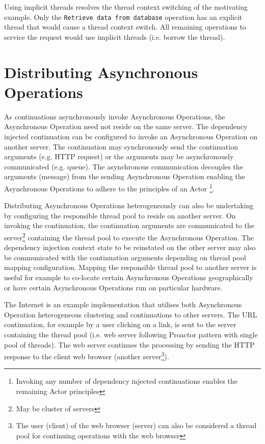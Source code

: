 \documentclass[prodmode]{style/acmlarge}
\begin{document}
Using implicit threads resolves the thread context switching of the motivating
example.  Only the \texttt{Retrieve data from database} operation has an
explicit thread that would cause a thread context switch.  All remaining
operations to service the request would use implicit threads (i.e. borrow the
thread).


\section{Distributing Asynchronous Operations}

As continuations asynchronously invoke Asynchronous Operations, the Asynchronous
Operation need not reside on the same server.  The dependency injected
continuation can be configured to invoke an Asynchronous Operation on another
server.  The continuation may synchronously send the continuation arguments
(e.g. HTTP request) or the arguments may be asynchronously communicated (e.g.
queue).  The asynchronous communication decouples the arguments (message) from
the sending Asynchronous Operation enabling the Asynchronous Operations to
adhere to the principles of an Actor \cite{actors}\footnote{Invoking any number
of dependency injected continuations enables the remaining Actor principles}.

Distributing Asynchronous Operations heterogeneously can also be undertaking by
configuring the responsible thread pool to reside on another server.  On
invoking the continuation, the continuation arguments are communicated to the
server\footnote{May be cluster of servers} containing the thread pool to execute
the Asynchronous Operation.  The dependency injection context state to be
reinstated on the other server may also be communicated with the continuation
arguments depending on thread pool mapping configuration.  Mapping the
responsible thread pool to another server is useful for example to co-locate
certain Asynchronous Operations geographically or have certain Asynchronous
Operations run on particular hardware.

The Internet is an example implementation that utilises both Asynchronous
Operation heterogeneous clustering and continuations to other servers.  The URL
continuation, for example by a user clicking on a link, is sent to the server
containing the thread pool (i.e. web server following Proactor pattern with
single pool of threads).  The web server continues the processing by sending the
HTTP response to the client web browser (another server\footnote{The user
(client) of the web browser (server) can also be considered a thread pool for
continuing operations with the web browser}).
\end{document}
